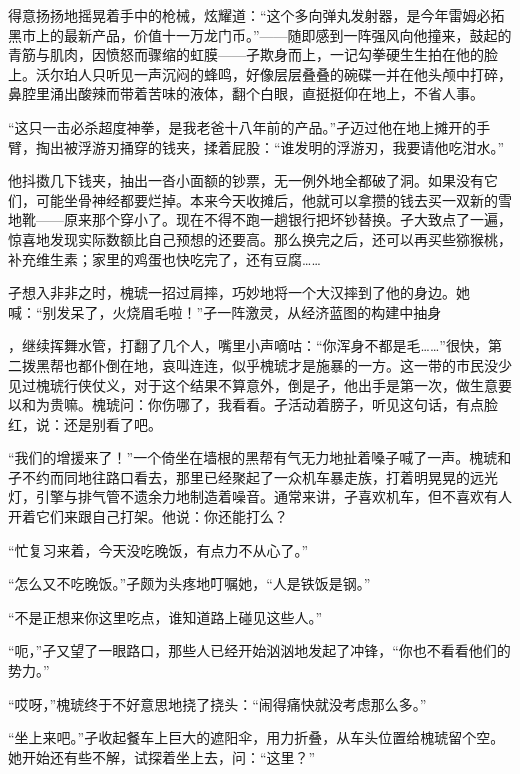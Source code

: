 \documentclass{article}
\begin{document}
\newpage 

得意扬扬地摇晃着手中的枪械，炫耀道：“这个多向弹丸发射器，是今年雷姆必拓黑市上的最新产品，价值十一万龙门币。”——随即感到一阵强风向他撞来，鼓起的青筋与肌肉，因愤怒而骤缩的虹膜——孑欺身而上，一记勾拳硬生生拍在他的脸上。沃尔珀人只听见一声沉闷的蜂鸣，好像层层叠叠的碗碟一并在他头颅中打碎，鼻腔里涌出酸辣而带着苦味的液体，翻个白眼，直挺挺仰在地上，不省人事。

“这只一击必杀超度神拳，是我老爸十八年前的产品。”孑迈过他在地上摊开的手臂，掏出被浮游刃捅穿的钱夹，揉着屁股：“谁发明的浮游刃，我要请他吃泔水。”

他抖擞几下钱夹，抽出一沓小面额的钞票，无一例外地全都破了洞。如果没有它们，可能坐骨神经都要烂掉。本来今天收摊后，他就可以拿攒的钱去买一双新的雪地靴——原来那个穿小了。现在不得不跑一趟银行把坏钞替换。孑大致点了一遍，惊喜地发现实际数额比自己预想的还要高。那么换完之后，还可以再买些猕猴桃，补充维生素；家里的鸡蛋也快吃完了，还有豆腐……

孑想入非非之时，槐琥一招过肩摔，巧妙地将一个大汉摔到了他的身边。她喊：“别发呆了，火烧眉毛啦！”孑一阵激灵，从经济蓝图的构建中抽身

\newpage 

，继续挥舞水管，打翻了几个人，嘴里小声嘀咕：“你浑身不都是毛……”很快，第二拨黑帮也都仆倒在地，哀叫连连，似乎槐琥才是施暴的一方。这一带的市民没少见过槐琥行侠仗义，对于这个结果不算意外，倒是孑，他出手是第一次，做生意要以和为贵嘛。槐琥问：你伤哪了，我看看。孑活动着膀子，听见这句话，有点脸红，说：还是别看了吧。

“我们的增援来了！”一个倚坐在墙根的黑帮有气无力地扯着嗓子喊了一声。槐琥和孑不约而同地往路口看去，那里已经聚起了一众机车暴走族，打着明晃晃的远光灯，引擎与排气管不遗余力地制造着噪音。通常来讲，孑喜欢机车，但不喜欢有人开着它们来跟自己打架。他说：你还能打么？

“忙复习来着，今天没吃晚饭，有点力不从心了。”

“怎么又不吃晚饭。”孑颇为头疼地叮嘱她，“人是铁饭是钢。”

“不是正想来你这里吃点，谁知道路上碰见这些人。”

“呃，”孑又望了一眼路口，那些人已经开始汹汹地发起了冲锋，“你也不看看他们的势力。”

“哎呀，”槐琥终于不好意思地挠了挠头：“闹得痛快就没考虑那么多。”

\newpage 



“坐上来吧。”孑收起餐车上巨大的遮阳伞，用力折叠，从车头位置给槐琥留个空。她开始还有些不解，试探着坐上去，问：“这里？”
\end{document}
